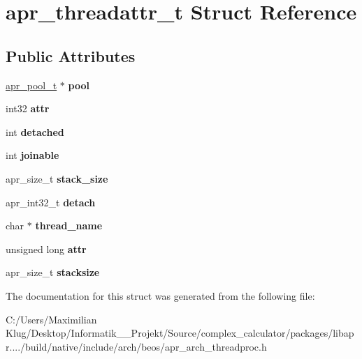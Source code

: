 \hypertarget{structapr__threadattr__t}{}\section{apr\+\_\+threadattr\+\_\+t Struct Reference}
\label{structapr__threadattr__t}
\subsection*{Public Attributes}
\begin{DoxyCompactItemize}
\item 
\mbox{\label{structapr__threadattr__t_ab56f0d904d2ddbba08df3e9a3aa5f049}} 
\mbox{\hyperlink{group__apr__pools_gaf137f28edcf9a086cd6bc36c20d7cdfb}{apr\+\_\+pool\+\_\+t}} $\ast$ {\bfseries pool}
\item 
\mbox{\label{structapr__threadattr__t_a481d3a9ce8976b40beae53f63cc98012}} 
int32 {\bfseries attr}
\item 
\mbox{\label{structapr__threadattr__t_ac96af472adab60a574168a81b605919f}} 
int {\bfseries detached}
\item 
\mbox{\label{structapr__threadattr__t_a91b992248a924b5930a805d183dcbd46}} 
int {\bfseries joinable}
\item 
\mbox{\label{structapr__threadattr__t_ab0c95add41d5f494fb28b373fb549f33}} 
apr\+\_\+size\+\_\+t {\bfseries stack\+\_\+size}
\item 
\mbox{\label{structapr__threadattr__t_acf5cc381c329e14e198193a694d11c8a}} 
apr\+\_\+int32\+\_\+t {\bfseries detach}
\item 
\mbox{\label{structapr__threadattr__t_af04e3acad7d29855ff0fc82e6aa048e0}} 
char $\ast$ {\bfseries thread\+\_\+name}
\item 
\mbox{\label{structapr__threadattr__t_afc5aedb6c80f23a7e82e2ff7d1c313cc}} 
unsigned long {\bfseries attr}
\item 
\mbox{\label{structapr__threadattr__t_afa9476d4c71309de2f452e11b7d07aeb}} 
apr\+\_\+size\+\_\+t {\bfseries stacksize}
\end{DoxyCompactItemize}


The documentation for this struct was generated from the following file\+:\begin{DoxyCompactItemize}
\item 
C\+:/\+Users/\+Maximilian Klug/\+Desktop/\+Informatik\+\_\+\_\+\+Projekt/\+Source/complex\+\_\+calculator/packages/libapr..../build/native/include/arch/beos/apr\+\_\+arch\+\_\+threadproc.\+h\end{DoxyCompactItemize}
